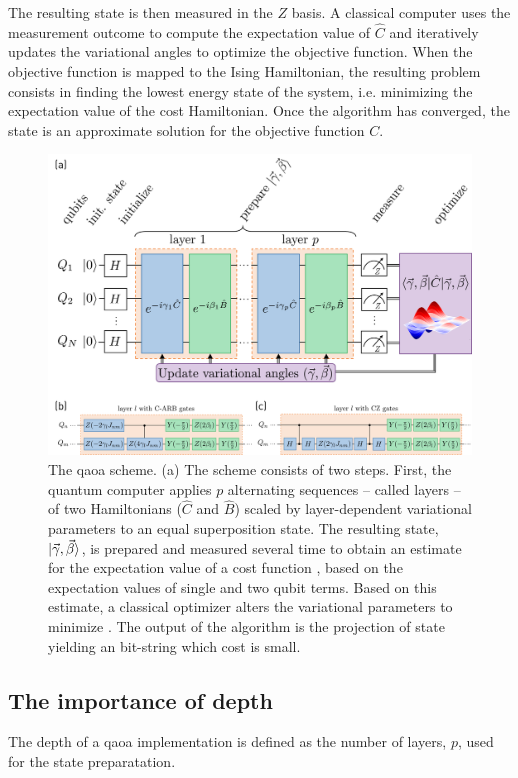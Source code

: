 The resulting state \qaoaMeasuredState{} is then measured in the $Z$ basis. A classical computer uses the measurement outcome to compute the expectation value of $\hat C$ and iteratively updates the variational angles to optimize the objective function. When the objective function is mapped to the Ising Hamiltonian, the resulting problem consists in finding the lowest energy state of the system, i.e. minimizing the expectation value of the cost Hamiltonian. Once the algorithm has converged, the state \optimalstate{} is an approximate solution for the objective function $C$.

\begin{figure}
    \centering
    \includegraphics[width=\textwidth]{chapters/qaoa/figs/qaoa_scheme.png}
    \caption{The \gls{qaoa} scheme. (a) The scheme consists of two steps. First, the quantum computer applies $p$ alternating sequences -- called layers -- of two Hamiltonians ($\hat C$ and $\hat B$) scaled by layer-dependent variational parameters to an equal superposition state. The resulting state, $\ket{\vec\gamma,\vec\beta}$, is prepared and measured several time to obtain an estimate for the expectation value of a cost function \cost, based on the expectation values of single and two qubit terms. Based on this estimate, a classical optimizer alters the variational parameters to minimize \cost. The output of the algorithm is the projection of state \optimalstate yielding an bit-string which cost is small. }
    \label{fig:qaoa_scheme}
\end{figure}
\subsection{The importance of depth}
The depth of a \gls{qaoa} implementation is defined as the number of layers, $p$, used for the state preparatation.

